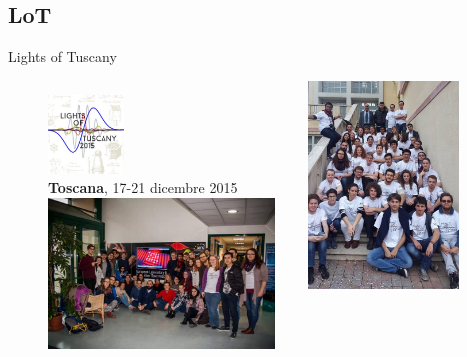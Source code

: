 \documentclass{Bredelebeamer}
\begin{document}
\subsection{LoT}
\begin{frame}{Lights of Tuscany}
\begin{figure}
\begin{columns}
\begin{column}{0.5\textwidth}
\vspace{1mm}
\centering 
\includegraphics[width=2cm]{images/LoT1.png}\\
\textbf{Toscana}, 17-21 dicembre 2015 \\ \vspace{0.5cm}
\includegraphics[width=6cm]{images/LoT6.jpg}
\end{column}
\begin{column}{0.5\textwidth}\centering
\includegraphics[width=4cm]{images/LoT2.jpg}
\end{column}
\end{columns}
\end{figure}
\end{frame}
\end{document}
